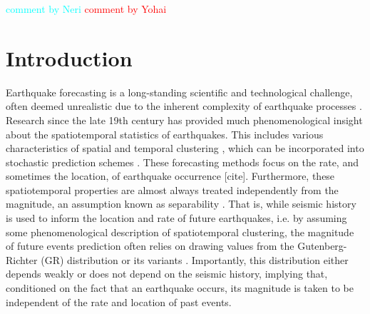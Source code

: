 \documentclass[pdflatex]{sn-jnl}
\newcommand{\yohai}[1]{{\textcolor{red}{#1}}}
\newcommand{\neri}[1]{{\textcolor{cyan}{#1}}}
\begin{document}
\maketitle

\neri{comment by Neri} \newline
\yohai{comment by Yohai}


\section{Introduction} \label{sec:introduction}



Earthquake forecasting is a long-standing scientific and technological challenge, often deemed unrealistic due to the inherent complexity of earthquake processes \cite{bernard_earthquake_1999, geller_earthquakes_1997}. Research since the late 19th century has provided much phenomenological insight about the spatiotemporal statistics of earthquakes. This includes various characteristics of spatial and temporal clustering \cite{omori_after-shocks_1894, kagan_short-term_2004, ben-zion_localization_2020}, which can be incorporated into stochastic prediction schemes \cite{ogata_statistical_1988, hardebeck_aftershock_2024, devries_deep_2018, king_static_1994}. These forecasting methods focus on the rate, and sometimes the location, of earthquake occurrence [cite]. Furthermore, these spatiotemporal properties are almost always treated independently from the magnitude, an assumption known as separability \cite{schoenberg_testing_2004}. That is, while seismic history is used to inform the location and rate of future earthquakes, i.e. by assuming some phenomenological description of spatiotemporal clustering, the magnitude of future events prediction often relies on drawing values from the Gutenberg-Richter (GR) distribution or its variants \cite{gutenberg_frequency_1944, kagan_seismic_2002, ogata_exploring_2018}. Importantly, this distribution either depends weakly or does not depend on the seismic history, implying that, conditioned on the fact that an earthquake occurs, its magnitude is taken to be independent of the rate and location of past events.

\end{document}
